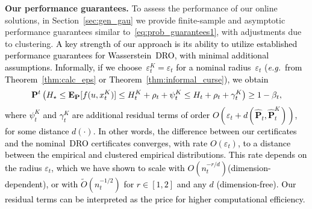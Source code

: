 \documentclass[12pt]{article}
\renewcommand{\paragraph}[1]{\textbf{#1.}\;}
\newcommand{\eg}{{\it e.g.}}
\newcommand{\prob}{{\mathbf P}}
\newcommand{\Expect}{{\mbox{\bf E}}}
\newcommand{\epsnom}{\varepsilon}
\newcommand{\RC}[1]{\textcolor{black}{#1}}
\newcommand{\RC}[1]{\textcolor{blue}{#1}}
\begin{document}
\paragraph{Our performance guarantees} To assess the performance of our online solutions, in Section~\ref{sec:gen_gau} we provide finite-sample and asymptotic performance guarantees similar to~\eqref{eq:prob_guarantees1}, with adjustments due to clustering. 
\RC{A key strength of our approach is its ability to utilize established performance guarantees for Wasserstein~\gls{DRO}, with minimal additional assumptions.}
\RC{Informally, if we choose~$\epsnom_t^K = \epsnom_t$ for a nominal radius~$\epsnom_t$ (\eg~from Theorem~\ref{thm:calc_eps} or Theorem~\ref{thm:informal_curse}), we obtain
\begin{equation}
\label{eq:informal}
\prob^{t}\left( H_\star \leq \Expect_{\prob}[f(u, x^K_t)] \le H^K_t + \rho_{t}+\psi^K_{t} \leq H_t +  \rho_{t}+\gamma^K_{t}\right) \ge 1 - \beta_{t},
\end{equation}
where $\psi^K_{t}$ and $\gamma^K_{t}$ are additional residual terms of order $O(\epsnom_{t}+d(\hat{\prob}_{t},\hat{\prob}_{t}^K))$,
for some distance $d(\cdot)$.}
\RC{In other words, the difference between our certificates and the nominal~\gls{DRO} certificates converges, with rate $O(\epsnom_t)$, to a distance between the empirical and clustered empirical distributions. This rate depends on the radius $\epsnom_t$, which we have shown to scale with $O(n_t^{-r/d})$(dimension-dependent), or with $\tilde{O}(n_t^{-1/2})$ for $r \in [1,2]$ and any $d$ (dimension-free).}
\RC{Our residual terms can be interpreted as the price for higher computational efficiency.}
\end{document}
